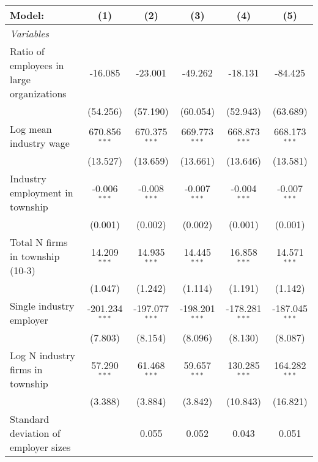 \begingroup
\centering
\begin{tabular}{lccccc}
   \tabularnewline \midrule \midrule
   Model:                                    & (1)              & (2)              & (3)              & (4)              & (5)\\  
   \midrule
   \emph{Variables}\\
   Ratio of employees in large organizations & -16.085          & -23.001          & -49.262          & -18.131          & -84.425\\   
                                             & (54.256)         & (57.190)         & (60.054)         & (52.943)         & (63.689)\\   
   Log mean industry wage                    & 670.856$^{***}$  & 670.375$^{***}$  & 669.773$^{***}$  & 668.873$^{***}$  & 668.173$^{***}$\\   
                                             & (13.527)         & (13.659)         & (13.661)         & (13.646)         & (13.581)\\   
   Industry employment in township           & -0.006$^{***}$   & -0.008$^{***}$   & -0.007$^{***}$   & -0.004$^{***}$   & -0.007$^{***}$\\   
                                             & (0.001)          & (0.002)          & (0.002)          & (0.001)          & (0.001)\\   
   Total N firms in township (10-3)          & 14.209$^{***}$   & 14.935$^{***}$   & 14.445$^{***}$   & 16.858$^{***}$   & 14.571$^{***}$\\   
                                             & (1.047)          & (1.242)          & (1.114)          & (1.191)          & (1.142)\\   
   Single industry employer                  & -201.234$^{***}$ & -197.077$^{***}$ & -198.201$^{***}$ & -178.281$^{***}$ & -187.045$^{***}$\\   
                                             & (7.803)          & (8.154)          & (8.096)          & (8.130)          & (8.087)\\   
   Log N industry firms in township          & 57.290$^{***}$   & 61.468$^{***}$   & 59.657$^{***}$   & 130.285$^{***}$  & 164.282$^{***}$\\   
                                             & (3.388)          & (3.884)          & (3.842)          & (10.843)         & (16.821)\\   
   Standard deviation of employer sizes      &                  & 0.055            & 0.052            & 0.043            & 0.051\\   

\end{tabular}
